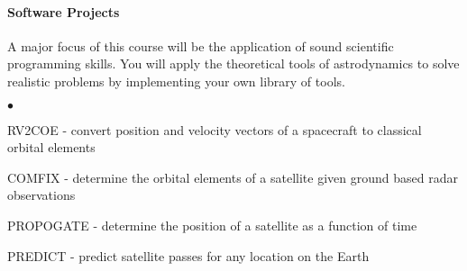 \documentclass[10pt]{article}
\begin{document}
\paragraph*{Software Projects}
A major focus of this course will be the application of sound scientific programming skills.
You will apply the theoretical tools of astrodynamics to solve realistic problems by implementing your own library of tools.

\begin{list}{$\bullet$}{\setlength{\itemsep}{-3pt}}
    \item RV2COE - convert position and velocity vectors of a spacecraft to classical orbital elements
    \item COMFIX - determine the orbital elements of a satellite given ground based radar observations
    \item PROPOGATE - determine the position of a satellite as a function of time
    \item PREDICT - predict satellite passes for any location on the Earth
    \end{list}
\end{document}
